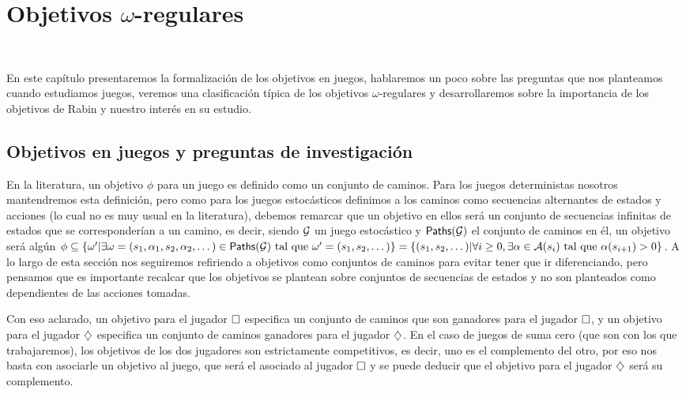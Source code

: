 \chapter{Objetivos $\omega$-regulares}
~\label{cap:objetivos}
\vspace{-1cm}


En este capítulo presentaremos la formalización de los objetivos en juegos,
hablaremos un poco sobre las preguntas que nos planteamos cuando estudiamos
juegos, veremos una clasificación típica de los objetivos $\omega$-regulares y
desarrollaremos sobre la importancia de los objetivos de Rabin y nuestro
interés en su estudio.

\section{Objetivos en juegos y preguntas de investigación}

En la literatura, un objetivo $\phi$ para un juego es definido como un conjunto
de caminos. Para los juegos deterministas nosotros mantendremos esta
definición, pero como para los juegos estocásticos definimos a los caminos como
secuencias alternantes de estados y acciones (lo cual no es muy usual en la
literatura), debemos remarcar que un objetivo en ellos será un conjunto de
secuencias infinitas de estados que se corresponderían a un camino, es decir,
siendo $\mathcal{G}$ un juego estocástico y $\textsf{Paths}(\mathcal{G})$ el conjunto de caminos en él,
un objetivo será algún $\phi \subseteq \{\omega' | \exists \omega = (s_1,
	\alpha_1, s_2, \alpha_2, \dots) \in \textsf{Paths}(\mathcal{G}) \text{ tal que } \omega' = (s_1,
	s_2, \dots)\} = \{(s_1, s_2, \dots) | \forall i \geq 0, \exists \alpha \in
	\mathcal{A}(s_i) \text{ tal que } \alpha(s_{i+1}) > 0\}$. A lo largo de esta sección
nos seguiremos refiriendo a objetivos como conjuntos de caminos para evitar
tener que ir diferenciando, pero pensamos que es importante recalcar que los
objetivos se plantean sobre conjuntos de secuencias de estados y no son
planteados como dependientes de las acciones tomadas.

Con eso aclarado, un objetivo para el jugador $\square$ especifica un conjunto de
caminos que son ganadores para el jugador $\square$, y un objetivo para el
jugador $\diamondsuit$ especifica un conjunto de caminos ganadores para el jugador
$\diamondsuit$. En el caso de juegos de suma cero (que son con los que trabajaremos),
los objetivos de los dos jugadores son estrictamente competitivos, es decir,
uno es el complemento del otro, por eso nos basta con asociarle un objetivo al
juego, que será el asociado al jugador $\square$ y se puede deducir que el
objetivo para el jugador $\diamondsuit$ será su complemento.

